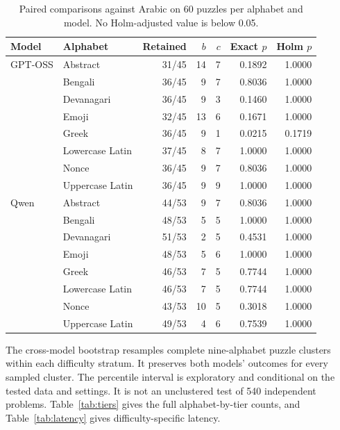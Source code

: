 \documentclass[11pt]{article}
\begin{document}
\begin{table}[t]
\centering\small
\begin{tabular}{llrrrrr}
\toprule
Model & Alphabet & Retained & $b$ & $c$ & Exact $p$ & Holm $p$\\
\midrule
GPT-OSS & Abstract & 31/45 & 14 & 7 & 0.1892 & 1.0000\\
& Bengali & 36/45 & 9 & 7 & 0.8036 & 1.0000\\
& Devanagari & 36/45 & 9 & 3 & 0.1460 & 1.0000\\
& Emoji & 32/45 & 13 & 6 & 0.1671 & 1.0000\\
& Greek & 36/45 & 9 & 1 & 0.0215 & 0.1719\\
& Lowercase Latin & 37/45 & 8 & 7 & 1.0000 & 1.0000\\
& Nonce & 36/45 & 9 & 7 & 0.8036 & 1.0000\\
& Uppercase Latin & 36/45 & 9 & 9 & 1.0000 & 1.0000\\
\midrule
Qwen & Abstract & 44/53 & 9 & 7 & 0.8036 & 1.0000\\
& Bengali & 48/53 & 5 & 5 & 1.0000 & 1.0000\\
& Devanagari & 51/53 & 2 & 5 & 0.4531 & 1.0000\\
& Emoji & 48/53 & 5 & 6 & 1.0000 & 1.0000\\
& Greek & 46/53 & 7 & 5 & 0.7744 & 1.0000\\
& Lowercase Latin & 46/53 & 7 & 5 & 0.7744 & 1.0000\\
& Nonce & 43/53 & 10 & 5 & 0.3018 & 1.0000\\
& Uppercase Latin & 49/53 & 4 & 6 & 0.7539 & 1.0000\\
\bottomrule
\end{tabular}
\caption{Paired comparisons against Arabic on 60 puzzles per alphabet and model. No Holm-adjusted value is below 0.05.}
\label{tab:paired}
\end{table}

The cross-model bootstrap resamples complete nine-alphabet puzzle clusters within each difficulty stratum. It preserves both models' outcomes for every sampled cluster. The percentile interval is exploratory and conditional on the tested data and settings. It is not an unclustered test of 540 independent problems. Table~\ref{tab:tiers} gives the full alphabet-by-tier counts, and Table~\ref{tab:latency} gives difficulty-specific latency.
\end{document}
